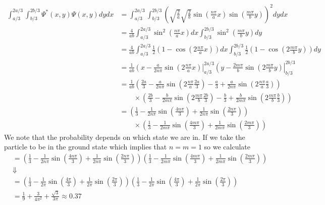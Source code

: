 \documentclass[11pt]{article}
\numberwithin{equation}{section}
\begin{document}
\begin{align*}
\int_{a/3}^{2a/3}\int_{b/3}^{2b/3}\Psi^*(x,y)\Psi(x,y)dydx &= \int_{a/3}^{2a/3}\int_{b/3}^{2b/3}\left(\sqrt{\frac{2}{a}}\sqrt{\frac{2}{b}}\sin\left(\frac{n\pi}{a}x\right)\sin\left(\frac{m\pi}{b}y\right)\right)^2dydx\\
&= \frac{4}{ab}\int_{a/3}^{2a/3}\sin^2\left(\frac{n\pi}{a}x\right)dx\int_{b/3}^{2b/3}\sin^2\left(\frac{m\pi}{b}y\right)dy\\
&= \frac{4}{ab}\int_{a/3}^{2a/3}\frac{1}{2}\left(1-\cos\left(2\frac{n\pi}{a}x\right)\right)dx\int_{b/3}^{2b/3}\frac{1}{2}\left(1-\cos\left(2\frac{m\pi}{b}y\right)\right)dy\\
&= \frac{1}{ab}\left(x-\frac{a}{2n\pi}\sin\left(2\frac{n\pi}{a}x\right)\right|_{a/3}^{2a/3}\left(y-\frac{2m\pi}{b}\sin\left(2\frac{m\pi}{b}y\right)\right|_{b/3}^{2b/3}\\
&= \frac{1}{ab}\left(\frac{2a}{3}-\frac{a}{2n\pi}\sin\left(2\frac{n\pi}{a}\frac{2a}{3}\right)-\frac{a}{3}+\frac{a}{2n\pi}\sin\left(2\frac{n\pi}{a}\frac{a}{3}\right)\right)\\
&\qquad \times\left(\frac{2b}{3}-\frac{b}{2m\pi}\sin\left(2\frac{m\pi}{b}\frac{2b}{3}\right) - \frac{b}{3}+\frac{b}{2m\pi}\sin\left(2\frac{m\pi}{b}\frac{b}{3}\right)\right)\\
&= \left(\frac{1}{3}-\frac{1}{2n\pi}\sin\left(\frac{4n\pi}{3}\right)+\frac{1}{2n\pi}\sin\left(\frac{2n\pi}{3}\right)\right)\\
&\qquad\times\left(\frac{1}{3}-\frac{1}{2m\pi}\sin\left(\frac{4m\pi}{3}\right) + \frac{1}{2m\pi}\sin\left(\frac{2m\pi}{3}\right)\right)
\end{align*}
We note that the probability depends on which state we are in. If we take the particle to be
in the ground state which implies that $n=m=1$ so we calculate
\begin{align*}
&= \left(\frac{1}{3}-\frac{1}{2n\pi}\sin\left(\frac{4n\pi}{3}\right)+\frac{1}{2n\pi}\sin\left(\frac{2n\pi}{3}\right)\right)\left(\frac{1}{3}-\frac{1}{2m\pi}\sin\left(\frac{4m\pi}{3}\right) + \frac{1}{2m\pi}\sin\left(\frac{2m\pi}{3}\right)\right)\\
&\Downarrow\\
&= \left(\frac{1}{3}-\frac{1}{2\pi}\sin\left(\frac{4\pi}{3}\right)+\frac{1}{2\pi}\sin\left(\frac{2\pi}{3}\right)\right)\left(\frac{1}{3}-\frac{1}{2\pi}\sin\left(\frac{4\pi}{3}\right) + \frac{1}{2\pi}\sin\left(\frac{2\pi}{3}\right)\right)\\
&= \frac{1}{9}+\frac{3}{4\pi^2}+\frac{\sqrt{3}}{3\pi}\approx 0.37
\end{align*}
\end{document}
